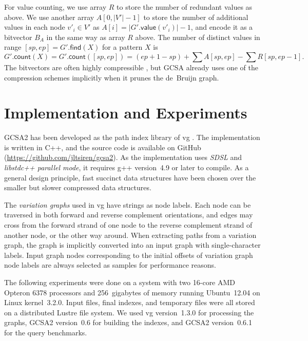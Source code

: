 \documentclass[a4paper,UKenglish]{lipics-v2016}
\newcommand{\abs}[1]{\ensuremath{\lvert #1 \rvert}}
\newcommand{\find}{\ensuremath{\mathsf{find}}}
\newcommand{\countq}{\ensuremath{\mathsf{count}}}
\newcommand{\gvalue}{\ensuremath{\mathsf{value}}}
\begin{document}
For value counting, we use array $R$ to store the number of redundant values as above. We use another array $A[0, \abs{V'}-1]$ to store the number of additional values in each node $v'_{i} \in V'$ as $A[i] = \abs{G'.\gvalue(v'_{i})}-1$, and encode it as a bitvector $B_{A}$ in the same way as array $R$ above. The number of distinct values in range $[sp,ep] = G'.\find(X)$ for a pattern $X$ is
$$
G'.\countq(X) = G'.\countq([sp, ep]) = (ep+1-sp) + \sum A[sp, ep] - \sum R[sp, ep-1].
$$
The bitvectors are often highly compressible \cite{Gagie2015}, but GCSA already uses one of the compression schemes implicitly when it prunes the de~Bruijn graph.


\section{Implementation and Experiments}

GCSA2 has been developed as the path index library of vg \cite{Garrison2014-2016}. The implementation is written in C++, and the source code is available on GitHub (\url{https://github.com/jltsiren/gcsa2}). As the implementation uses \emph{SDSL} \cite{Gog2014b} and \emph{libstdc++ parallel mode}, it requires g++ version~4.9 or later to compile. As a general design principle, fast succinct data structures have been chosen over the smaller but slower compressed data structures.

The \emph{variation graphs} used in vg have strings as node labels. Each node can be traversed in both forward and reverse complement orientations, and edges may cross from the forward strand of one node to the reverse complement strand of another node, or the other way around. When extracting paths from a variation graph, the graph is implicitly converted into an input graph with single-character labels. Input graph nodes corresponding to the initial offsets of variation graph node labels are always selected as samples for performance reasons.

The following experiments were done on a system with two 16\nobreakdash-core AMD Opteron 6378 processors and 256~gigabytes of memory running Ubuntu~12.04 on Linux kernel~3.2.0. Input files, final indexes, and temporary files were all stored on a distributed Lustre file system. We used vg version~1.3.0 for processing the graphs, GCSA2 version~0.6 for building the indexes, and GCSA2 version~0.6.1 for the query benchmarks.
\end{document}
